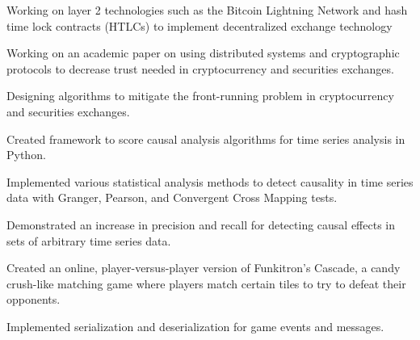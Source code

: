 
\begin{tightemize}
  \item Working on layer 2 technologies such as the Bitcoin Lightning Network and hash time lock contracts (HTLCs) to implement decentralized exchange technology
  \item Working on an academic paper on using distributed systems and cryptographic protocols to decrease trust needed in cryptocurrency and securities exchanges.
  \item Designing algorithms to mitigate the front-running problem in cryptocurrency and securities exchanges.
\end{tightemize}
\subsectionsep

\begin{tightemize}
\item Created framework to score causal analysis algorithms for time series
  analysis in Python.
\item Implemented various statistical analysis methods to detect causality in
  time series data with Granger, Pearson, and Convergent Cross Mapping tests.
\item Demonstrated an increase in precision and recall for detecting causal effects in sets of
  arbitrary time series data.
\end{tightemize}
\subsectionsep

\begin{tightemize}
\item Created an online, player-versus-player version of Funkitron's Cascade,
  a candy crush-like matching game where players match certain tiles to try to
  defeat their opponents.
\item Implemented serialization and deserialization for game events and messages.
\end{tightemize}
\subsectionsep